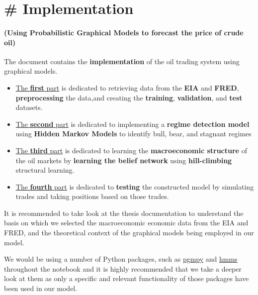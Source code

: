 \hypertarget{implementation}{%
\section{\# Implementation}\label{implementation}}

\hypertarget{using-probabilistic-graphical-models-to-forecast-the-price-of-crude-oil}{%
\paragraph{(Using Probabilistic Graphical Models to forecast the price
of crude
oil)}\label{using-probabilistic-graphical-models-to-forecast-the-price-of-crude-oil}}

The document contains the \textbf{implementation} of the oil trading
system using graphical models.

\begin{itemize}
\tightlist
\item
  \protect\hyperlink{first}{The \textbf{first} part} is dedicated to
  retrieving data from the \textbf{EIA} and \textbf{FRED},
  \textbf{preprocessing} the data,and creating the \textbf{training},
  \textbf{validation}, and \textbf{test} datasets.
\item
  \protect\hyperlink{second}{The \textbf{second} part} is dedicated to
  implementing a \textbf{regime detection model} using \textbf{Hidden
  Markov Models} to identify bull, bear, and stagnant regimes
\item
  \protect\hyperlink{third}{The \textbf{third} part} is dedicated to
  learning the \textbf{macroeconomic structure} of the oil markets by
  \textbf{learning the belief network} using \textbf{hill-climbing}
  structural learning.
\item
  \protect\hyperlink{fourth}{The \textbf{fourth} part} is dedicated to
  \textbf{testing} the constructed model by simulating trades and taking
  positions based on those trades.
\end{itemize}

It is recommended to take look at the thesis documentation to understand
the basis on which we selected the macroeconomic economic data from the
EIA and FRED, and the theoretical context of the graphical models being
employed in our model.

We would be using a number of Python packages, such as
\href{http://pgmpy.org/}{pgmpy} and
\href{https://github.com/lopatovsky/HMMs}{hmms} throughout the notebook
and it is highly recommended that we take a deeper look at them as only
a specific and relevant functionality of those packages have been used
in our model.

